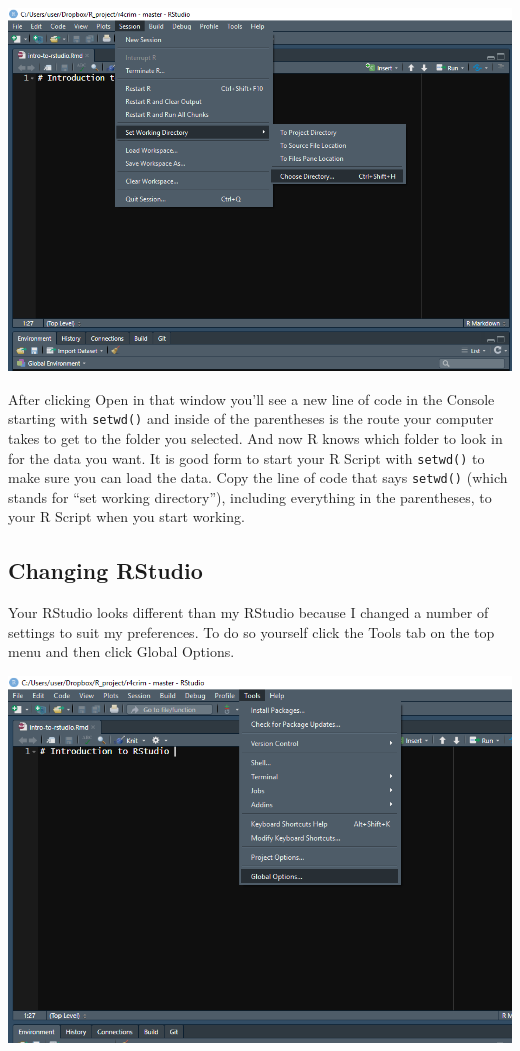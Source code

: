 \documentclass[
  12pt,
]{book}
\begin{document}
\includegraphics{images/rstudio_3.PNG}

After clicking Open in that window you'll see a new line of code in the Console starting with \texttt{setwd()} and inside of the parentheses is the route your computer takes to get to the folder you selected. And now R knows which folder to look in for the data you want. It is good form to start your R Script with \texttt{setwd()} to make sure you can load the data. Copy the line of code that says \texttt{setwd()} (which stands for ``set working directory''), including everything in the parentheses, to your R Script when you start working.

\hypertarget{changing-rstudio}{%
\subsection{Changing RStudio}\label{changing-rstudio}}

Your RStudio looks different than my RStudio because I changed a number of settings to suit my preferences. To do so yourself click the Tools tab on the top menu and then click Global Options.

\includegraphics{images/rstudio_5.PNG}
\end{document}
